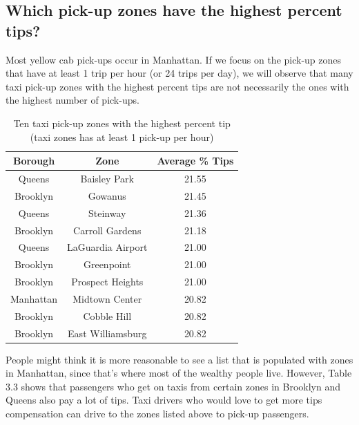 \documentclass[12pt,twoside]{reedthesis}
\theoremstyle{definition}
\theoremstyle{definition}
\theoremstyle{definition}
\theoremstyle{remark}
\begin{document}
\subsection{Which pick-up zones have the highest percent
tips?}\label{which-pick-up-zones-have-the-highest-percent-tips}

Most yellow cab pick-ups occur in Manhattan. If we focus on the pick-up
zones that have at least 1 trip per hour (or 24 trips per day), we will
observe that many taxi pick-up zones with the highest percent tips are
not necessarily the ones with the highest number of pick-ups.
\begin{table}

\caption{\label{tab:unnamed-chunk-44}Ten taxi pick-up zones with the highest percent tip (taxi zones has at least 1 pick-up per hour)}
\centering
\begin{tabular}[t]{ccc}
\toprule
Borough & Zone & Average \% Tips\\
\midrule
Queens & Baisley Park & 21.55\\
Brooklyn & Gowanus & 21.45\\
Queens & Steinway & 21.36\\
Brooklyn & Carroll Gardens & 21.18\\
Queens & LaGuardia Airport & 21.00\\
\addlinespace
Brooklyn & Greenpoint & 21.00\\
Brooklyn & Prospect Heights & 21.00\\
Manhattan & Midtown Center & 20.82\\
Brooklyn & Cobble Hill & 20.82\\
Brooklyn & East Williamsburg & 20.82\\
\bottomrule
\end{tabular}
\end{table}
People might think it is more reasonable to see a list that is populated
with zones in Manhattan, since that's where most of the wealthy people
live. However, Table 3.3 shows that passengers who get on taxis from
certain zones in Brooklyn and Queens also pay a lot of tips. Taxi
drivers who would love to get more tips compensation can drive to the
zones listed above to pick-up passengers.
\end{document}
